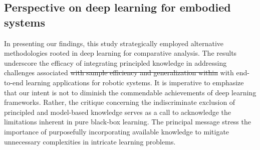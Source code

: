 \documentclass[12pt, a4paper]{article}
\begin{document}
\subsection*{Perspective on deep learning for embodied systems}
In presenting our findings, this study strategically employed alternative methodologies rooted in deep learning for comparative analysis. The results underscore the efficacy of integrating principled knowledge in addressing challenges associated \st{with sample efficiency and generalization within} with end-to-end learning applications for robotic systems. It is imperative to emphasize that our intent is not to diminish the commendable achievements of deep learning frameworks. Rather, the critique concerning the indiscriminate exclusion of principled and model-based knowledge serves as a call to acknowledge the limitations inherent in pure black-box learning. The principal message stress the importance of purposefully incorporating available knowledge to mitigate unnecessary complexities in intricate learning problems.
\end{document}
